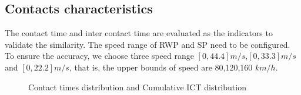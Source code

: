 \subsection{Contacts characteristics}

The contact time and inter contact time are evaluated as the indicators to validate the similarity. The speed range of RWP and SP need to be configured. To ensure the accuracy, we choose three speed range $[0,44.4]m/s$,$[0,33.3]m/s$ and $[0,22.2]m/s$, that is, the upper bounds of speed are 80,120,160 $km/h$.


\begin{figure}
\centering
{}
\caption{Contact times distribution and Cumulative ICT distribution}\label{figure_contacts}
\end{figure}

